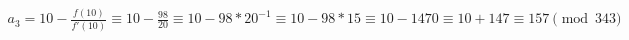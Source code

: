 \documentclass[preview]{standalone}
\begin{document}
\begin{align*}
a_3 = 10 - \frac{f(10)}{f'(10)}  \equiv 10 - \frac{98}{20} \equiv 10 - 98*20^{-1} \equiv 10 - 98*15 \equiv 10 - 1470 \equiv 10 + 147 \equiv 157 \pmod{343}
\end{align*}
\end{document}
